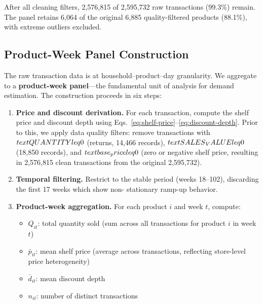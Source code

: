 \documentclass[12pt,a4paper]{article}
\begin{document}
After all cleaning filters, 2,576,815 of 2,595,732 raw transactions
(99.3\%) remain. The panel retains 6,064 of the original 6,885
quality-filtered products (88.1\%), with extreme outliers excluded.

\subsection{Product-Week Panel Construction}
\label{sec:panel-construction}

The raw transaction data is at household--product--day granularity.
We aggregate to a \textbf{product-week panel}---the fundamental unit
of analysis for demand estimation. The construction proceeds in six
steps:

\begin{enumerate}
\item \textbf{Price and discount derivation.} For each transaction,
compute the shelf price and discount depth using
Eqs.~\eqref{eq:shelf-price}--\eqref{eq:discount-depth}.
Prior to this, we apply data quality filters: remove transactions
with $\\text{QUANTITY} \\leq 0$ (returns, 14{,}466 records),
$\\text{SALES\\_VALUE} \\leq 0$ (18{,}850 records), and
$\\text{base\\_price} \\leq 0$ (zero or negative shelf price,
resulting in 2{,}576{,}815 clean transactions from the original
2{,}595{,}732).

\item \textbf{Temporal filtering.} Restrict to the stable period
(weeks 18--102), discarding the first 17 weeks which show non-
stationary ramp-up behavior.

\item \textbf{Product-week aggregation.} For each product $i$ and
week $t$, compute:
\begin{itemize}[nosep]
\item $Q_{it}$: total quantity sold (sum across all transactions for
product $i$ in week $t$)
\item $\bar{p}_{it}$: mean shelf price (average across transactions,
reflecting store-level price heterogeneity)
\item $\bar{d}_{it}$: mean discount depth
\item $n_{it}$: number of distinct transactions
\end{itemize}


\end{enumerate}
\end{document}
